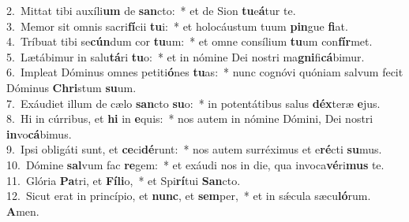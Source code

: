 {2.~}Mittat tibi auxíli\textbf{um} de \textbf{san}cto:~* et de Sion \textbf{tu}e\textbf{á}tur te.\\
{3.~}Memor sit omnis sacri\textbf{fí}cii \textbf{tu}i:~* et holocáustum tuum \textbf{pin}gue \textbf{fi}at.\\
{4.~}Tríbuat tibi se\textbf{cún}dum cor \textbf{tu}um:~* et omne consílium \textbf{tu}um con\textbf{fír}met.\\
{5.~}Lætábimur in salu\textbf{tá}ri \textbf{tu}o:~* et in nómine Dei nostri ma\textbf{gni}fi\textbf{cá}bimur.\\
{6.~}Impleat Dóminus omnes petiti\textbf{ó}nes \textbf{tu}as:~* nunc cognóvi quóniam salvum fecit Dóminus \textbf{Chri}stum \textbf{su}um.\\
{7.~}Exáudiet illum de cælo \textbf{san}cto \textbf{su}o:~* in potentátibus salus \textbf{déx}teræ \textbf{e}jus.\\
{8.~}Hi in cúrribus, et \textbf{hi} in \textbf{e}quis:~* nos autem in nómine Dómini, Dei nostri \textbf{in}vo\textbf{cá}bimus.\\
{9.~}Ipsi obligáti sunt, et \textbf{ce}ci\textbf{dé}runt:~* nos autem surréximus et e\textbf{ré}cti \textbf{su}mus.\\
{10.~}Dómine \textbf{sal}vum fac \textbf{re}gem:~* et exáudi nos in die, qua invoca\textbf{vé}ri\textbf{mus} te.\\
{11.~}Glória \textbf{Pa}tri, et \textbf{Fí}\textbf{li}o,~* et Spi\textbf{rí}tui \textbf{San}cto.\\
{12.~}Sicut erat in princípio, et \textbf{nunc}, et \textbf{sem}per,~* et in sǽcula sæcu\textbf{ló}rum. \textbf{A}men.\\
